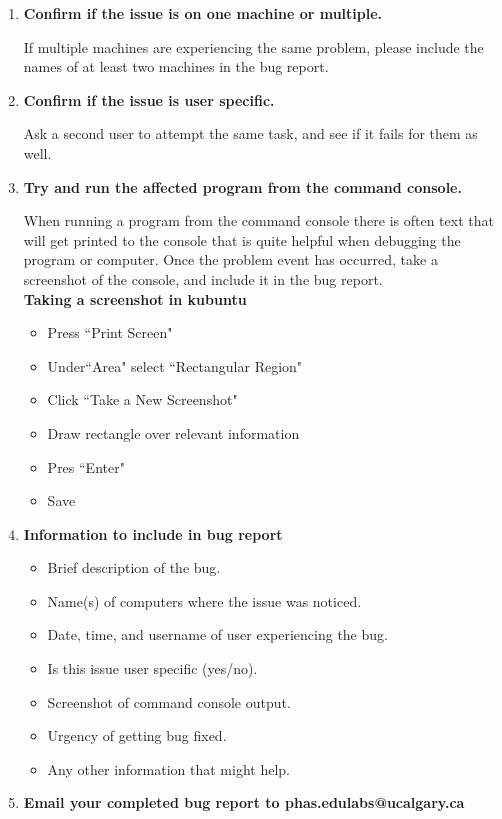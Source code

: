 \documentclass{../../../assets/LabArx-Dev} 	%
\begin{document}
\begin{enumerate}

\item {\bf Confirm if the issue is on one machine or multiple.}

If multiple machines are experiencing the same problem, please include the names of at least two machines in the bug report.
	
\item {\bf Confirm if the issue is user specific.}

Ask a second user to attempt the same task, and see if it fails for them as well.

\item {\bf Try and run the affected program from the command console.}

When running a program from the command console there is often text that will get printed to the console that is quite helpful when debugging the program or computer. Once the problem event has occurred, take a screenshot of the console, and include it in the bug report.\\

{\bf Taking a screenshot in kubuntu}
	\begin{itemize}
		\item Press ``Print Screen"
		\item Under``Area" select ``Rectangular Region"
		\item Click ``Take a New Screenshot"
		\item Draw rectangle over relevant information
		\item Pres ``Enter"
		\item Save
	\end{itemize}		

\item {\bf Information to include in bug report}
	\begin{itemize}
		\item Brief description of the bug.
		\item Name(s) of computers where the issue was noticed.
		\item Date, time, and username of user experiencing the 			bug.
		\item Is this issue user specific (yes/no).
		\item Screenshot of command console output.
		\item Urgency of getting bug fixed.
		\item Any other information that might help.
	\end{itemize}

\item {\bf Email your completed bug report to phas.edulabs@ucalgary.ca} 



\end{enumerate}
\end{document}
